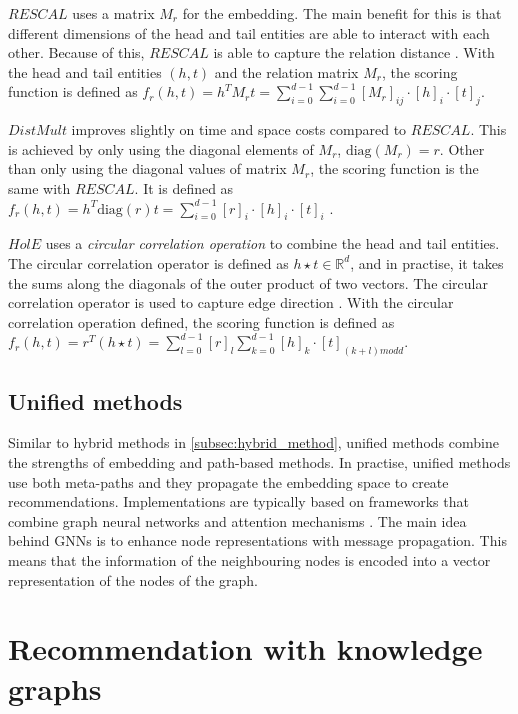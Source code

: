 \documentclass[english, 12pt, a4paper, sci, utf8, a-2b, online]{aaltothesis}
\begin{document}
$RESCAL$ uses a matrix $M_r$ for the embedding. The main benefit for this is that different dimensions of the head and tail entities are able to interact with each other. Because of this, $RESCAL$ is able to capture the relation distance \parencite{hogan2021knowledge}. With the head and tail entities $(h,t)$ and the relation matrix $M_r$, the scoring function is defined as $f_r(h,t) = h^T M_rt = \sum_{i = 0}^{d-1}\sum_{i = 0}^{d-1}[M_r]_{ij}\cdot[h]_i\cdot[t]_j$.

$DistMult$ improves slightly on time and space costs compared to $RESCAL$. This is achieved by only using the diagonal elements of $M_r$, $\text{diag}(M_r) = r$. Other than only using the diagonal values of matrix $M_r$, the scoring function is the same with $RESCAL$. It is defined as $f_r(h,t) = h^T \text{diag}(r)t = \sum_{i=0}^{d-1}[r]_i\cdot[h]_i\cdot[t]_i$ \parencite{hogan2021knowledge}.

$HolE$ uses a \textit{circular correlation operation} to combine the head and tail entities. The circular correlation operator is defined as $h\star t \in \mathbb{R}^d$, and in practise, it takes the sums along the diagonals of the outer product of two vectors. The circular correlation operator is used to capture edge direction \parencite{hogan2021knowledge}. With the circular correlation operation defined, the scoring function is defined as $f_r(h,t) = r^T(h \star t) = \sum_{l=0}^{d-1} [r]_l \sum_{k=0}^{d-1} [h]_k \cdot [t]_{(k+l)mod d}$.




\subsection{Unified methods}
\label{subsec:unified_methods}

Similar to hybrid methods in \autoref{subsec:hybrid_method}, unified methods combine the strengths of embedding and path-based methods. In practise, unified methods use both meta-paths and they propagate the embedding space to create recommendations. Implementations are typically based on frameworks that combine graph neural networks and attention mechanisms \parencite{hogan2021knowledge}. The main idea behind GNNs is to enhance node representations with message propagation. This means that the information of the neighbouring nodes is encoded into a vector representation of the nodes of the graph. 

\newpage

\section{Recommendation with knowledge graphs}
\label{sec:KG-based_RS}
\end{document}
